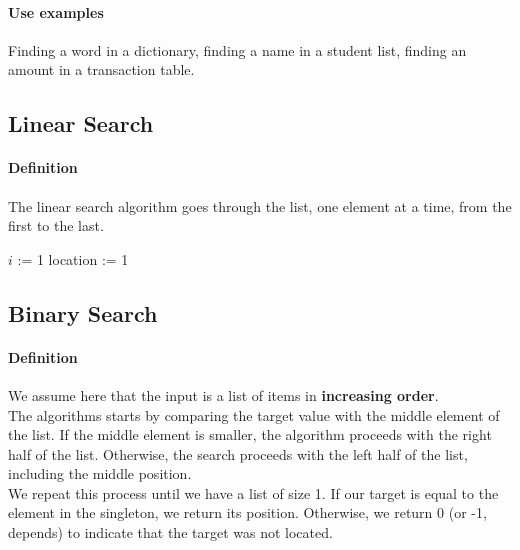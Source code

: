 \documentclass[10pt,a4paper]{book}
\begin{document}
\paragraph*{Use examples}
Finding a word in a dictionary, finding a name in a student list, finding an amount in a transaction table.

\subsection{Linear Search}
\paragraph*{Definition}
The linear search algorithm goes through the list, one element at a time, from the first to the last.
\begin{algorithm}
\DontPrintSemicolon
$i$ := 1\;
location := 1\;
\end{algorithm}

\subsection{Binary Search}
\paragraph*{Definition}
We assume here that the input is a list of items in \textbf{increasing order}.\\
The algorithms starts by comparing the target value with the middle element of the list. If the middle element is smaller, the algorithm proceeds with the right half of the list. Otherwise, the search proceeds with the left half of the list, including the middle position.\\
We repeat this process until we have a list of size 1. If our target is equal to the element in the singleton, we return its position. Otherwise, we return 0 (or -1, depends) to indicate that the target was not located.
\end{document}
